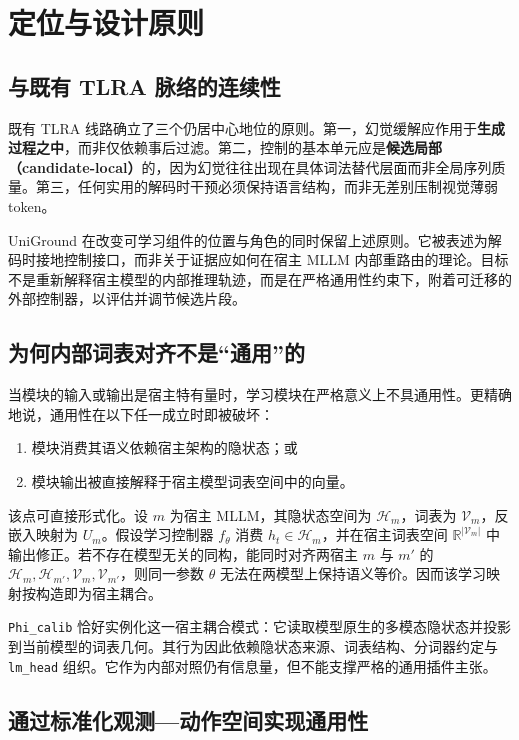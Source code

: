 \section{定位与设计原则}
\label{sec:positioning}

\subsection{与既有 TLRA 脉络的连续性}

既有 TLRA 线路确立了三个仍居中心地位的原则。第一，幻觉缓解应作用于\textbf{生成过程之中}，而非仅依赖事后过滤。第二，控制的基本单元应是\textbf{候选局部（candidate-local）}的，因为幻觉往往出现在具体词法替代层面而非全局序列质量。第三，任何实用的解码时干预必须保持语言结构，而非无差别压制视觉薄弱 token。

UniGround 在改变可学习组件的位置与角色的同时保留上述原则。它被表述为解码时接地控制接口，而非关于证据应如何在宿主 MLLM 内部重路由的理论。目标不是重新解释宿主模型的内部推理轨迹，而是在严格通用性约束下，附着可迁移的外部控制器，以评估并调节候选片段。

\subsection{为何内部词表对齐不是``通用''的}

当模块的输入或输出是宿主特有量时，学习模块在严格意义上不具通用性。更精确地说，通用性在以下任一成立时即被破坏：
\begin{enumerate}
  \item 模块消费其语义依赖宿主架构的隐状态；或
  \item 模块输出被直接解释于宿主模型词表空间中的向量。
\end{enumerate}

该点可直接形式化。设 $m$ 为宿主 MLLM，其隐状态空间为 $\mathcal{H}_m$，词表为 $\mathcal{V}_m$，反嵌入映射为 $U_m$。假设学习控制器 $f_\theta$ 消费 $h_t \in \mathcal{H}_m$，并在宿主词表空间 $\mathbb{R}^{|\mathcal{V}_m|}$ 中输出修正。若不存在模型无关的同构，能同时对齐两宿主 $m$ 与 $m'$ 的 $\mathcal{H}_m,\mathcal{H}_{m'},\mathcal{V}_m,\mathcal{V}_{m'}$，则同一参数 $\theta$ 无法在两模型上保持语义等价。因而该学习映射按构造即为宿主耦合。

\texttt{Phi\_calib} 恰好实例化这一宿主耦合模式：它读取模型原生的多模态隐状态并投影到当前模型的词表几何。其行为因此依赖隐状态来源、词表结构、分词器约定与 \texttt{lm\_head} 组织。它作为内部对照仍有信息量，但不能支撑严格的通用插件主张。

\subsection{通过标准化观测—动作空间实现通用性}

